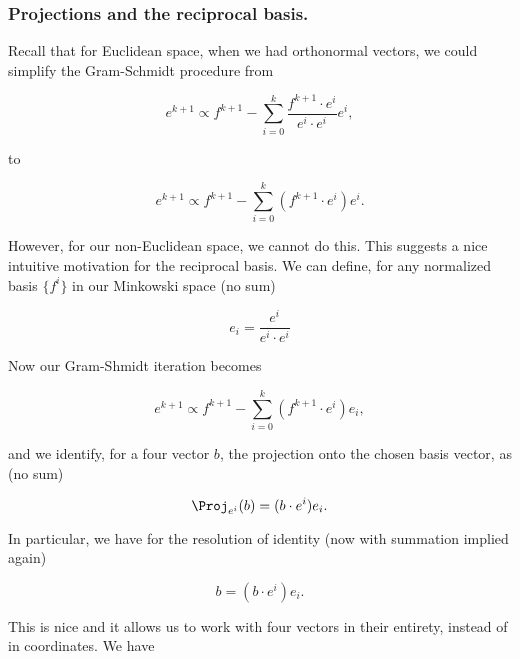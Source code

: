 \subsubsection{Projections and the reciprocal basis.}

Recall that for Euclidean space, when we had orthonormal vectors, we could simplify the Gram-Schmidt procedure from

\begin{equation}\label{eqn:relativisticElectrodynamicsT2:770b}
e^{k+1} \propto f^{k+1} - \sum_{i=0}^k \frac{f^{k+1} \cdot e^i}{e^i \cdot e^i} e^i,
\end{equation}

to

\begin{equation}\label{eqn:relativisticElectrodynamicsT2:770c}
e^{k+1} \propto f^{k+1} - \sum_{i=0}^k \left( f^{k+1} \cdot e^i \right) e^i.
\end{equation}

However, for our non-Euclidean space, we cannot do this.  This suggests a nice intuitive motivation for the reciprocal basis.  We can define, for any normalized basis $\{f^i\}$ in our Minkowski space (no sum)

\begin{equation}\label{eqn:relativisticElectrodynamicsT2:775}
e_i = \frac{e^i}{e^i \cdot e^i}
\end{equation}

Now our Gram-Shmidt iteration becomes

\begin{equation}\label{eqn:relativisticElectrodynamicsT2:770e}
e^{k+1} \propto f^{k+1} - \sum_{i=0}^k \left( f^{k+1} \cdot e^i \right) e_i,
\end{equation}

and we identify, for a four vector $b$, the projection onto the chosen basis vector, as (no sum)

\begin{equation}\label{eqn:relativisticElectrodynamicsT2:780b}
\Proj_{e^i}(b) = (b \cdot e^i) e_i.
\end{equation}

In particular, we have for the resolution of identity (now with summation implied again)

\begin{equation}\label{eqn:relativisticElectrodynamicsT2:790}
b = (b \cdot e^i) e_i.
\end{equation}

This is nice and it allows us to work with four vectors in their entirety, instead of in coordinates.  We have

